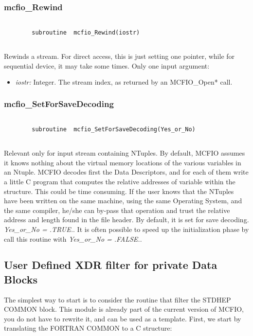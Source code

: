 \subsubsection{mcfio\_Rewind}

\begin{verbatim}

        subroutine  mcfio_Rewind(iostr)
    
\end{verbatim}

Rewinds a stream. For direct access, this is just setting 
one pointer, while for sequential device, it may take some 
times.  Only one input argument: 
\begin{itemize} 
\item {\em iostr:} Integer. The stream index, as returned by an MCFIO\_Open* 
call. 
\end{itemize}

\subsubsection{mcfio\_SetForSaveDecoding}

\begin{verbatim}

        subroutine  mcfio_SetForSaveDecoding(Yes_or_No)
    
\end{verbatim}

Relevant only for input stream containing NTuples. 
By default, MCFIO assumes it knows nothing about the virtual memory 
locations of the various variables in an Ntuple.  MCFIO decodes first the 
Data Descriptors, and for each of them write a little C program that 
computes the relative addresses of variable within the structure.  
This could be time consuming.  If the user knows that the NTuples have 
been written on the same machine, using the same Operating System, and the same 
compiler, he/she can by-pass that operation and trust the relative address and 
length found in the file header.  By default, it is set for save decoding. 
{\em Yes\_or\_No = .TRUE.}. It is often possible to speed up the initialization
phase by call this routine with  {\em Yes\_or\_No = .FALSE.}.   

\subsection{User Defined XDR filter for private Data Blocks}

	The simplest way to start is to consider the routine that 
filter the STDHEP COMMON block.  This module is already part of 
the current version of MCFIO, you do not have to rewrite it, and 
can be used as a template. First, we start by translating the FORTRAN 
COMMON to a C structure: 

